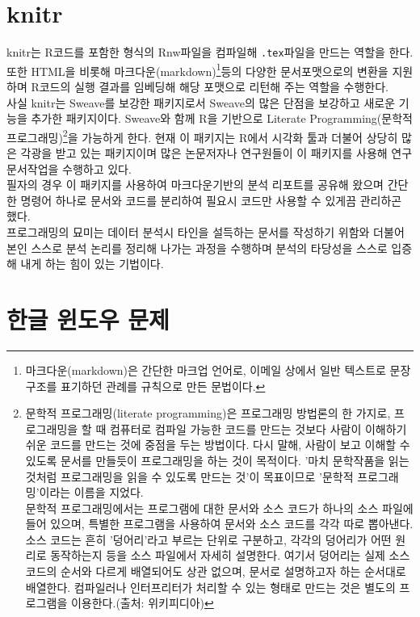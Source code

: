 \documentclass[11pt]{article}\usepackage{graphicx, color}
\begin{document}
\section{knitr}
knitr는 R코드를 포함한  형식의 Rnw파일을 컴파일해 \verb|.tex|파일을 만드는 역할을 한다. 또한 HTML을 비롯해 마크다운(markdown)\footnote{마크다운(markdown)은 간단한 마크업 언어로, 이메일 상에서 일반 텍스트로 문장 구조를 표기하던 관례를 규칙으로 만든 문법이다.}등의 다양한 문서포맷으로의 변환을 지원하며 R코드의 실행 결과를 임베딩해 해당 포맷으로 리턴해 주는 역할을 수행한다. 
\\
사실 knitr는 Sweave를 보강한 패키지로서 Sweave의 많은 단점을 보강하고 새로운 기능을 추가한 패키지이다. Sweave와 함께 R을 기반으로 Literate Programming(문학적 프로그래밍)\footnote{문학적 프로그래밍(literate programming)은 프로그래밍 방법론의 한 가지로, 프로그래밍을 할 때 컴퓨터로 컴파일 가능한 코드를 만드는 것보다 사람이 이해하기 쉬운 코드를 만드는 것에 중점을 두는 방법이다. 다시 말해, 사람이 보고 이해할 수 있도록 문서를 만들듯이 프로그래밍을 하는 것이 목적이다. '마치 문학작품을 읽는 것처럼 프로그래밍을 읽을 수 있도록 만드는 것'이 목표이므로 '문학적 프로그래밍'이라는 이름을 지었다.
\\
문학적 프로그래밍에서는 프로그램에 대한 문서와 소스 코드가 하나의 소스 파일에 들어 있으며, 특별한 프로그램을 사용하여 문서와 소스 코드를 각각 따로 뽑아낸다. 소스 코드는 흔히 '덩어리'라고 부르는 단위로 구분하고, 각각의 덩어리가 어떤 원리로 동작하는지 등을 소스 파일에서 자세히 설명한다. 여기서 덩어리는 실제 소스 코드의 순서와 다르게 배열되어도 상관 없으며, 문서로 설명하고자 하는 순서대로 배열한다. 컴파일러나 인터프리터가 처리할 수 있는 형태로 만드는 것은 별도의 프로그램을 이용한다.(출처: 위키피디아)}을 가능하게 한다. 현재 이 패키지는 R에서 시각화 툴과 더불어 상당히 많은 각광을 받고 있는 패키지이며 많은 논문저자나 연구원들이 이 패키지를 사용해 연구문서작업을 수행하고 있다. 
\\
필자의 경우 이 패키지를 사용하여 마크다운기반의 분석 리포트를 공유해 왔으며 간단한 명령어 하나로 문서와 코드를 분리하여 필요시 코드만 사용할 수 있게끔 관리하곤 했다. 
\\
 프로그래밍의 묘미는 데이터 분석시 타인을 설득하는 문서를 작성하기 위함와 더불어 본인 스스로 분석 논리를 정리해 나가는 과정을 수행하며 분석의 타당성을 스스로 입증해 내게 하는 힘이 있는 기법이다. \rm 



\section{한글 윈도우 문제}
\end{document}
